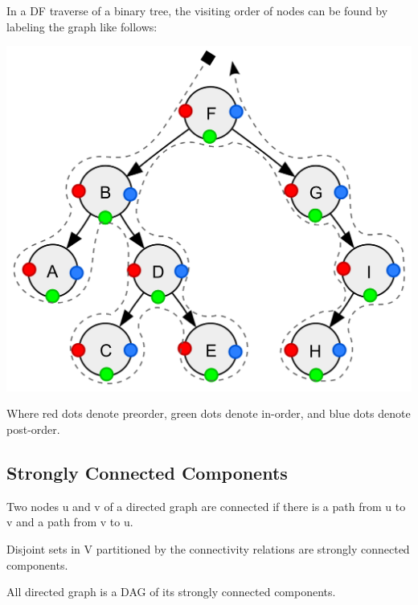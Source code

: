 \begin{remark}
	In a DF traverse of a binary tree, the visiting order of nodes can be found by labeling the graph like follows: \\
	\begin{center}
		\includegraphics[scale=0.2]{images/dfs_order.png} \\
	\end{center}
	Where red dots denote preorder, green dots denote in-order, and blue dots denote post-order.
\end{remark}

\subsection{Strongly Connected Components}

\begin{definition}
	Two nodes u and v of a directed graph are connected if there is a path from u to v and a path from v to u.
\end{definition}

\begin{definition}
	Disjoint sets in V partitioned by the connectivity relations are strongly connected components.
\end{definition}

\begin{theorem}
	All directed graph is a DAG of its strongly connected components.
\end{theorem}